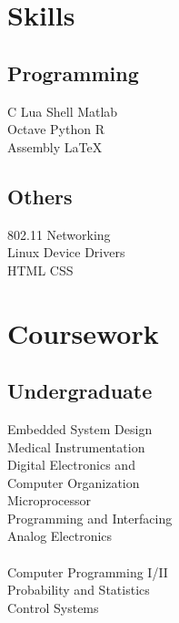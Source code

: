 \documentclass[letterpaper]{deedy-resume} %
\begin{document}
\noindent\makebox[\linewidth]{\color{headings}\rule{\linewidth}{0.4pt}} %
\begin{minipage}[t]{0.25\textwidth} %
\section{Skills}
\subsection{Programming}
C \textbullet{} Lua \textbullet{} Shell \textbullet{} Matlab \\
Octave \textbullet{} Python \textbullet{} R \\
Assembly \textbullet{} \LaTeX
\vspace{\topsep}
\subsection{Others}
802.11 \textbullet{} Networking \textbullet{} \\
Linux Device Drivers \textbullet{} \\
HTML \textbullet{} CSS
\lsectionspace %
\section{Coursework}
\subsection{Undergraduate}
\textbullet{} Embedded System Design \\
\textbullet{} Medical Instrumentation \\
\textbullet{} Digital Electronics and \\ \hphantom{\textbullet{}} Computer Organization \\
\textbullet{} Microprocessor \\ \hphantom{\textbullet{}} Programming and Interfacing \\
\textbullet{} Analog Electronics \\
 \\
\textbullet{} Computer Programming I/II \\
\textbullet{} Probability and Statistics \\
\textbullet{} Control Systems \\

\end{minipage}
\end{document}
